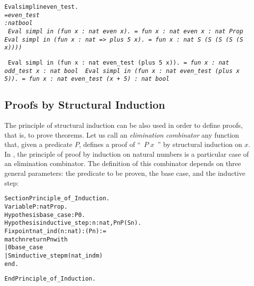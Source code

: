 \documentclass[11pt]{article}
\newtheorem{exercise}{Exercise}[section]
\begin{document}
\begin{alltt}
Eval simpl in even_test.
\it
    = even_test
     : nat {\arrow} bool
\tt 
Eval simpl in (fun x : nat {\funarrow} even x).
\it
     = fun x : nat {\funarrow} even x
     : nat {\arrow} Prop
\tt
Eval simpl in (fun x : nat => plus 5 x).
\it
     =  fun x : nat {\funarrow} S (S (S (S (S x))))

\tt
Eval simpl in (fun x : nat {\funarrow} even_test (plus 5 x)).
\it
    = fun x : nat {\funarrow} odd_test x
     : nat {\arrow} bool
\tt
Eval simpl in (fun x : nat {\funarrow} even_test (plus x 5)).
\it
    = fun x : nat {\funarrow} even_test (x + 5)
     : nat {\arrow} bool
\end{alltt}
 


\subsection{Proofs by Structural Induction}

The principle of structural induction can be also used in order to
define proofs, that is, to prove theorems. Let us call an
\textsl{elimination combinator} any function that, given a predicate
$P$, defines a proof of ``~$P\;x$~'' by structural induction on $x$.  In
{\coq}, the principle of proof by induction on natural numbers is a
particular case of an elimination combinator. The definition of this
combinator depends on three general parameters: the predicate to be
proven, the base case, and the inductive step:

\begin{alltt}
Section Principle_of_Induction.
Variable    P               : nat {\arrow} Prop.
Hypothesis  base_case       : P 0.
Hypothesis  inductive_step  : {\prodsym} n:nat, P n {\arrow} P (S n).
Fixpoint nat_ind  (n:nat)   : (P n) := 
   match n return P n with
          | 0 {\funarrow} base_case
          | S m {\funarrow} inductive_step m (nat_ind m)
   end. 

End Principle_of_Induction.
\end{alltt}
\end{document}
